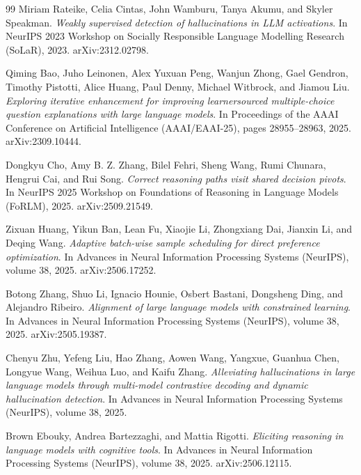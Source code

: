 \begin{thebibliography}{99}
Miriam Rateike, Celia Cintas, John Wamburu, Tanya Akumu, and Skyler Speakman.
\textit{Weakly supervised detection of hallucinations in LLM activations}.
In NeurIPS 2023 Workshop on Socially Responsible Language Modelling Research (SoLaR), 2023.
arXiv:2312.02798.

Qiming Bao, Juho Leinonen, Alex Yuxuan Peng, Wanjun Zhong, Gael Gendron, Timothy Pistotti, Alice Huang, Paul Denny, Michael Witbrock, and Jiamou Liu.
\textit{Exploring iterative enhancement for improving learnersourced multiple-choice question explanations with large language models}.
In Proceedings of the AAAI Conference on Artificial Intelligence (AAAI/EAAI-25), pages 28955--28963, 2025.
arXiv:2309.10444.

Dongkyu Cho, Amy B. Z. Zhang, Bilel Fehri, Sheng Wang, Rumi Chunara, Hengrui Cai, and Rui Song.
\textit{Correct reasoning paths visit shared decision pivots}.
In NeurIPS 2025 Workshop on Foundations of Reasoning in Language Models (FoRLM), 2025.
arXiv:2509.21549.

Zixuan Huang, Yikun Ban, Lean Fu, Xiaojie Li, Zhongxiang Dai, Jianxin Li, and Deqing Wang.
\textit{Adaptive batch-wise sample scheduling for direct preference optimization}.
In Advances in Neural Information Processing Systems (NeurIPS), volume 38, 2025.
arXiv:2506.17252.

Botong Zhang, Shuo Li, Ignacio Hounie, Osbert Bastani, Dongsheng Ding, and Alejandro Ribeiro.
\textit{Alignment of large language models with constrained learning}.
In Advances in Neural Information Processing Systems (NeurIPS), volume 38, 2025.
arXiv:2505.19387.

Chenyu Zhu, Yefeng Liu, Hao Zhang, Aowen Wang, Yangxue, Guanhua Chen, Longyue Wang, Weihua Luo, and Kaifu Zhang.
\textit{Alleviating hallucinations in large language models through multi-model contrastive decoding and dynamic hallucination detection}.
In Advances in Neural Information Processing Systems (NeurIPS), volume 38, 2025.

Brown Ebouky, Andrea Bartezzaghi, and Mattia Rigotti.
\textit{Eliciting reasoning in language models with cognitive tools}.
In Advances in Neural Information Processing Systems (NeurIPS), volume 38, 2025.
arXiv:2506.12115.


\end{thebibliography}
